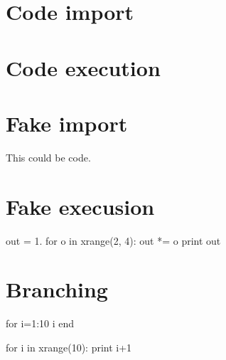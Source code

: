 \documentclass{article}
\begin{document}
\section*{Code import}


\section*{Code execution}


\section*{Fake import}

This could be code.

\section*{Fake execusion}

out = 1.
for o in xrange(2, 4):
    out *= o
print out

\section*{Branching}

for i=1:10
    i
end

for i in xrange(10):
    print i+1
\end{document}
